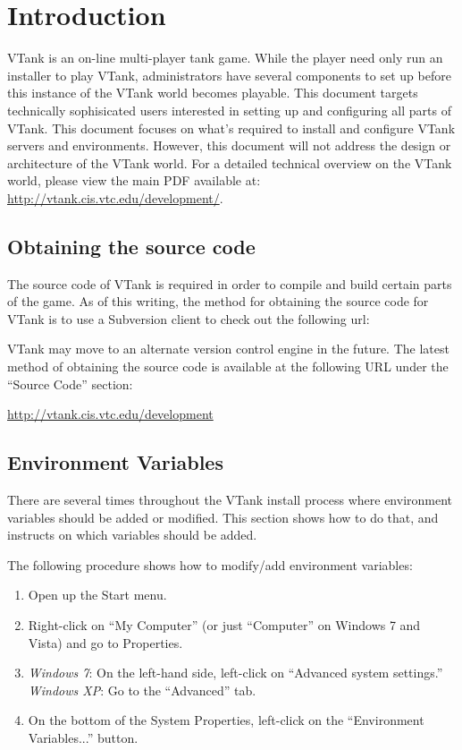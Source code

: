 \chapter{Introduction}
\label{intro}
VTank is an on-line multi-player tank game. While the player need only run an installer to play VTank, administrators have several components to set up before this instance of the VTank world becomes playable. This document targets technically sophisicated users interested in setting up and configuring all parts of VTank. This document focuses on what's required to install and configure VTank servers and environments. However, this document will not address the design or architecture of the VTank world. For a detailed technical overview on the VTank world, please view the main PDF available at: \url{http://vtank.cis.vtc.edu/development/}.

\section{Obtaining the source code}
\label{src}

The source code of VTank is required in order to compile and build certain parts of the game. As of this writing, the method for obtaining the source code for VTank is to use a Subversion client to check out the following url:


VTank may move to an alternate version control engine in the future. The latest method of obtaining the source code is available at the following URL under the ``Source Code'' section:

\url{http://vtank.cis.vtc.edu/development}

\section{Environment Variables}
\label{env-variables}

There are several times throughout the VTank install process where environment variables should be added or modified. This section shows how to do that, and instructs on which variables should be added.

\label{procedure-modify-properties}
The following procedure shows how to modify/add environment variables:
\begin{enumerate}
	\item Open up the Start menu.
	\item Right-click on ``My Computer'' (or just ``Computer'' on Windows 7 and Vista) and go to Properties.
	\item \emph{Windows 7}: On the left-hand side, left-click on ``Advanced system settings.''\\
	\emph{Windows XP}: Go to the ``Advanced'' tab.
	\item On the bottom of the System Properties, left-click on the ``Environment Variables...'' button.
\end{enumerate}

